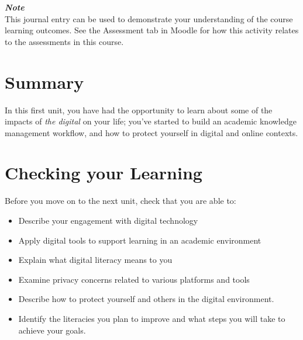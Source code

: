 \documentclass[
]{book}
\providecommand{\tightlist}{%
  \setlength{\itemsep}{0pt}\setlength{\parskip}{0pt}}
\theoremstyle{definition}
\theoremstyle{definition}
\theoremstyle{definition}
\theoremstyle{definition}
\theoremstyle{remark}
\begin{document}
\begin{feedback}
\textbf{\emph{Note}}\\
This journal entry can be used to demonstrate your understanding of the
course learning outcomes. See the Assessment tab in Moodle for how this
activity relates to the assessments in this course.
\end{feedback}

\hypertarget{summary}{%
\section*{Summary}\label{summary}}

In this first unit, you have had the opportunity to learn about some of the impacts of \emph{the digital} on your life; you've started to build an academic knowledge management workflow, and how to protect yourself in digital and online contexts.

\hypertarget{checking-your-learning}{%
\section*{Checking your Learning}\label{checking-your-learning}}

\begin{progress}
Before you move on to the next unit, check that you are able to:

\begin{itemize}
\tightlist
\item
  Describe your engagement with digital technology\\
\item
  Apply digital tools to support learning in an academic environment\\
\item
  Explain what digital literacy means to you\\
\item
  Examine privacy concerns related to various platforms and tools\\
\item
  Describe how to protect yourself and others in the digital environment.\\
\item
  Identify the literacies you plan to improve and what steps you will take to achieve your goals.
\end{itemize}
\end{progress}
\end{document}
